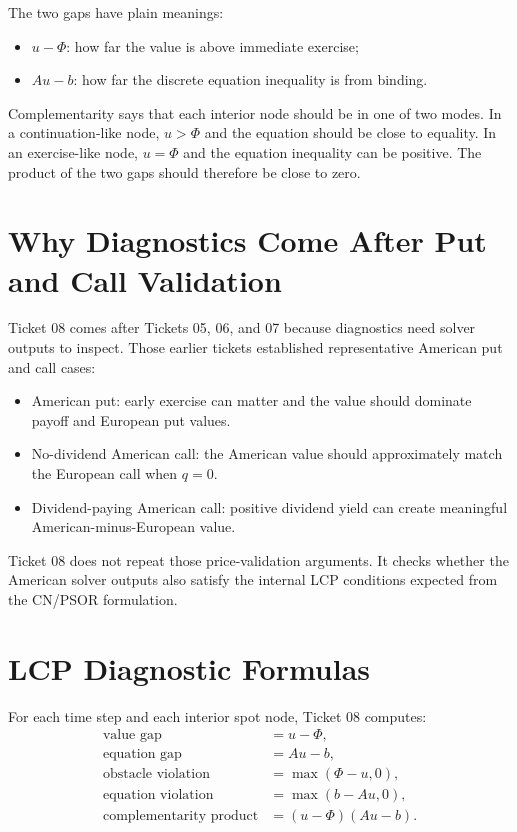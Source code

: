 \documentclass[11pt,a4paper]{article}
\begin{document}
The two gaps have plain meanings:
\begin{itemize}
  \item \(u-\Phi\): how far the value is above immediate exercise;
  \item \(Au-b\): how far the discrete equation inequality is from binding.
\end{itemize}

Complementarity says that each interior node should be in one of two modes. In a continuation-like
node, \(u>\Phi\) and the equation should be close to equality. In an exercise-like node,
\(u=\Phi\) and the equation inequality can be positive. The product of the two gaps should
therefore be close to zero.

\section{Why Diagnostics Come After Put and Call Validation}

Ticket 08 comes after Tickets 05, 06, and 07 because diagnostics need solver outputs to inspect.
Those earlier tickets established representative American put and call cases:
\begin{itemize}
  \item American put: early exercise can matter and the value should dominate payoff and European
        put values.
  \item No-dividend American call: the American value should approximately match the European
        call when \(q=0\).
  \item Dividend-paying American call: positive dividend yield can create meaningful
        American-minus-European value.
\end{itemize}

Ticket 08 does not repeat those price-validation arguments. It checks whether the American
solver outputs also satisfy the internal LCP conditions expected from the CN/PSOR formulation.

\section{LCP Diagnostic Formulas}

For each time step and each interior spot node, Ticket 08 computes:
\begin{align}
  \text{value gap} &= u - \Phi,\\
  \text{equation gap} &= Au - b,\\
  \text{obstacle violation} &= \max(\Phi-u,0),\\
  \text{equation violation} &= \max(b-Au,0),\\
  \text{complementarity product} &= (u-\Phi)(Au-b).
\end{align}
\end{document}
